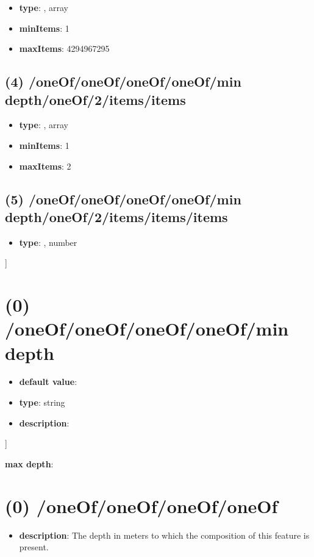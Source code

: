 \begin{itemize}[leftmargin=3em]\item {\bf type}: , array\item {\bf minItems}: 1
\item {\bf maxItems}: 4294967295
\end{itemize}\subsection{(4) /oneOf/oneOf/oneOf/oneOf/min depth/oneOf/2/items/items}
\begin{itemize}[leftmargin=4em]\item {\bf type}: , array\item {\bf minItems}: 1
\item {\bf maxItems}: 2
\end{itemize}\subsection{(5) /oneOf/oneOf/oneOf/oneOf/min depth/oneOf/2/items/items/items}
\begin{itemize}[leftmargin=5em]\item {\bf type}: , number\end{itemize}]\section{(0) /oneOf/oneOf/oneOf/oneOf/min depth}
\begin{itemize}[leftmargin=0em]\item {\bf default value}: 
\item {\bf type}: string
\item {\bf description}: 
\end{itemize}]\item {\bf max depth}: \section{(0) /oneOf/oneOf/oneOf/oneOf}
\begin{itemize}[leftmargin=0em]\item {\bf description}: The depth in meters to which the composition of this feature is present.
\end{itemize}
